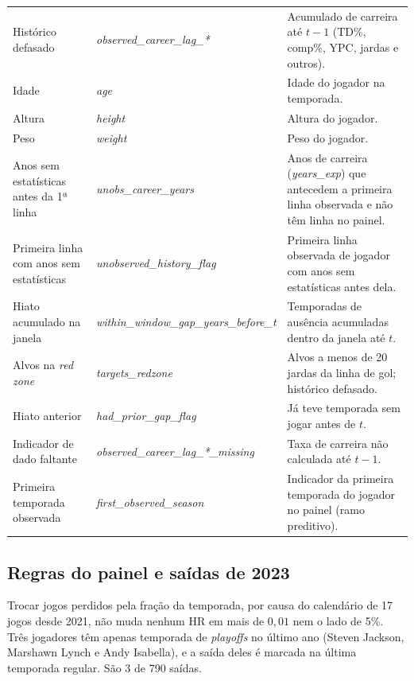 \begin{longtable}{@{}>{\raggedright\arraybackslash}p{4.3cm}>{\raggedright\arraybackslash}p{5.6cm}>{\raggedright\arraybackslash}p{4.9cm}@{}}
Histórico defasado & \textit{observed\_career\_lag\_*} & Acumulado de carreira até $t-1$ (TD\%, comp\%, YPC, jardas e outros). \\
Idade & \textit{age} & Idade do jogador na temporada. \\
Altura & \textit{height} & Altura do jogador. \\
Peso & \textit{weight} & Peso do jogador. \\
Anos sem estatísticas antes da 1ª linha & \textit{unobs\_career\_years} & Anos de carreira (\textit{years\_exp}) que antecedem a primeira linha observada e não têm linha no painel. \\
Primeira linha com anos sem estatísticas & \textit{unobserved\_history\_flag} & Primeira linha observada de jogador com anos sem estatísticas antes dela. \\
Hiato acumulado na janela & \textit{within\_window\_gap\_\newline years\_before\_t} & Temporadas de ausência acumuladas dentro da janela até $t$. \\
Alvos na \textit{red zone} & \textit{targets\_redzone} & Alvos a menos de 20 jardas da linha de gol; histórico defasado. \\
Hiato anterior & \textit{had\_prior\_gap\_flag} & Já teve temporada sem jogar antes de $t$. \\
Indicador de dado faltante & \textit{observed\_career\_lag\_*\_missing} & Taxa de carreira não calculada até $t-1$. \\
Primeira temporada observada & \textit{first\_observed\_season} & Indicador da primeira temporada do jogador no painel (ramo preditivo). \\
\end{longtable}
\endgroup

\subsection{Regras do painel e saídas de 2023}
\label{apx:regras_painel}

Trocar jogos perdidos pela fração da temporada, por causa do calendário de 17 jogos desde 2021, não muda nenhum HR em mais de $0{,}01$ nem o lado de 5\%. Três jogadores têm apenas temporada de \textit{playoffs} no último ano (Steven Jackson, Marshawn Lynch e Andy Isabella), e a saída deles é marcada na última temporada regular. São 3 de 790 saídas.

